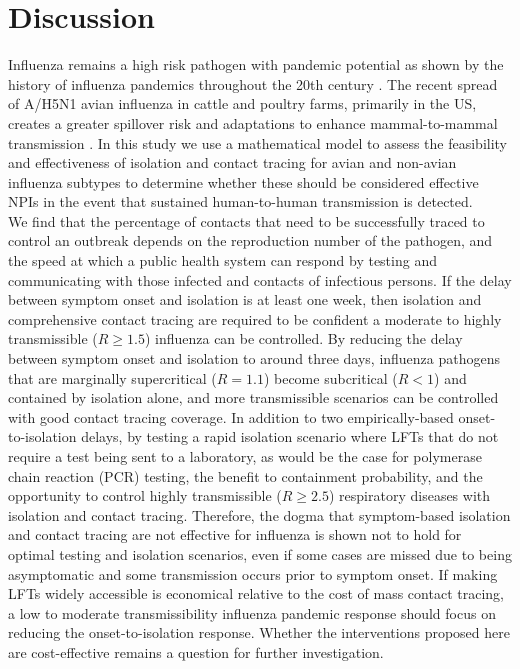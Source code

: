 \documentclass{article}
\begin{document}
\section*{Discussion}

Influenza remains a high risk pathogen with pandemic potential as shown by the history of influenza pandemics throughout the 20th century \citep{saunders-hastingsReviewingHistoryPandemic2016}. The recent spread of A/H5N1 avian influenza in cattle and poultry farms, primarily in the US, creates a greater spillover risk and adaptations to enhance mammal-to-mammal transmission \citep{linSingleMutationBovine2024, gargHighlyPathogenicAvian2025, peacockGlobalH5N1Influenza2025}. In this study we use a mathematical model to assess the feasibility and effectiveness of isolation and contact tracing for avian and non-avian influenza subtypes to determine whether these should be considered effective NPIs in the event that sustained human-to-human transmission is detected. \\

We find that the percentage of contacts that need to be successfully traced to control an outbreak depends on the reproduction number of the pathogen, and the speed at which a public health system can respond by testing and communicating with those infected and contacts of infectious persons. If the delay between symptom onset and isolation is at least one week, then isolation and comprehensive contact tracing are required to be confident a moderate to highly transmissible ($R \geq 1.5$) influenza can be controlled. By reducing the delay between symptom onset and isolation to around three days, influenza pathogens that are marginally supercritical ($R = 1.1$) become subcritical ($R < 1$) and contained by isolation alone, and more transmissible scenarios can be controlled with good contact tracing coverage. In addition to two empirically-based onset-to-isolation delays, by testing a rapid isolation scenario where LFTs that do not require a test being sent to a laboratory, as would be the case for polymerase chain reaction (PCR) testing, the benefit to containment probability, and the opportunity to control highly transmissible ($R \geq 2.5$) respiratory diseases with isolation and contact tracing. Therefore, the dogma that symptom-based isolation and contact tracing are not effective for influenza is shown not to hold for optimal testing and isolation scenarios, even if some cases are missed due to being asymptomatic and some transmission occurs prior to symptom onset. If making LFTs widely accessible is economical relative to the cost of mass contact tracing, a low to moderate transmissibility influenza pandemic response should focus on reducing the onset-to-isolation response. Whether the interventions proposed here are cost-effective remains a question for further investigation. \\
\end{document}

